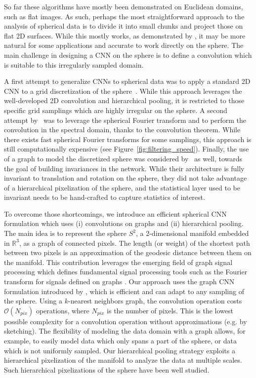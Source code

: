 \documentclass[final,twocolumn,3p,times,authoryear]{elsarticle}
\newcommand{\figref}[1]{Figure~\ref{fig:#1}}
\newcommand{\1}{\b{1}}              %
\newcommand{\0}{\b{0}}              %
\begin{document}
So far these algorithms have mostly been demonstrated on Euclidean domains, such as flat images.
As such, perhaps the most straightforward approach to the analysis of spherical data is to divide it into small chunks and project those on flat 2D surfaces.
While this mostly works, as demonstrated by \citep{fluri2018deep,gupta2018nongaussianinformation,schmelze2017cosmologicalmodel,gillet2018deeplearning}, it may be more natural for some applications and accurate to work directly on the sphere.
The main challenge in designing a CNN on the sphere is to define a convolution which is suitable to this irregularly sampled domain.

A first attempt to generalize CNNs to spherical data was to apply a standard 2D CNN to a grid discretization of the sphere~\citep{boomsma2017spherical}. While this approach leverages the well-developed 2D convolution and hierarchical pooling, it is restricted to those specific grid samplings which are highly irregular on the sphere.
A second attempt by~\citet{cohen2018spherical} was to leverage the spherical Fourier transform and to perform the convolution in the spectral domain, thanks to the convolution theorem. While there exists fast spherical Fourier transforms for some samplings, this approach is still computationally expensive (see \figref{filtering_speed}).
Finally, the use of a graph to model the discretized sphere was considered by~\citet{khasanova2017graphomni} as well, towards the goal of building invariances in the network. While their architecture is fully invariant to translation and rotation on the sphere, they did not take advantage of a hierarchical pixelization of the sphere, and the statistical layer used to be invariant needs to be hand-crafted to capture statistics of interest.

To overcome those shortcomings, we introduce an efficient spherical CNN formulation which uses (i) convolutions on graphs and (ii) hierarchical pooling. The main idea is to represent the sphere $S^2$, a 2-dimensional manifold embedded in $\mathbb{R}^3$, as a graph of connected pixels. The length (or weight) of the shortest path between two pixels is an approximation of the geodesic distance between them on the manifold.
This contribution leverages the emerging field of graph signal processing which defines fundamental signal processing tools such as the Fourier transform for signals defined on graphs \citep{shuman2013emerging}.
Our approach uses the graph CNN formulation introduced by \citet{defferrard2016convolutional}, which is efficient and can adapt to any sampling of the sphere. Using a $k$-nearest neighbors graph, the convolution operation costs $\mathcal{O}(N_{pix})$ operations, where $N_{pix}$ is the number of pixels. This is the lowest possible complexity for a convolution operation without approximations (e.g. by sketching).
The flexibility of modeling the data domain with a graph allows, for example, to easily model data which only spans a part of the sphere, or data which is not uniformly sampled.
Our hierarchical pooling strategy exploits a hierarchical pixelization of the manifold to analyze the data at multiple scales.
Such hierarchical pixelizations of the sphere have been well studied.
\end{document}
